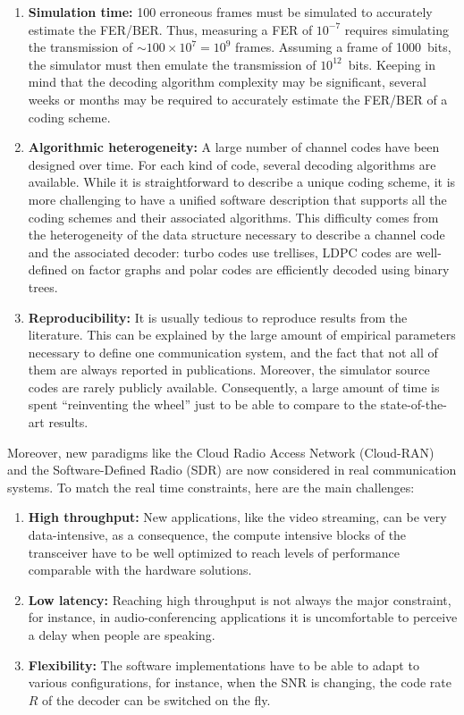 \begin{enumerate}
  \item \textbf{Simulation time:}
    100 erroneous frames must be simulated to accurately estimate the FER/BER.
    Thus, measuring a FER of $10^{-7}$ requires simulating the transmission of
    $\sim100\times 10^7=10^9$ frames. Assuming a frame of 1000~bits, the
    simulator must then emulate the transmission of $10^{12}$~bits. Keeping in
    mind that the decoding algorithm complexity may be significant, several
    weeks or months may be required to accurately estimate the FER/BER of a
    coding scheme.

  \item \textbf{Algorithmic heterogeneity:} A large number of channel codes have
    been designed over time. For each kind of code, several decoding algorithms
    are available. While it is straightforward to describe a unique coding
    scheme, it is more challenging to have a unified software description that
    supports all the coding schemes and their associated algorithms. This
    difficulty comes from the heterogeneity of the data structure necessary to
    describe a channel code and the associated decoder: turbo codes use
    trellises, LDPC codes are well-defined on factor graphs and polar codes are
    efficiently decoded using binary trees.

  \item \textbf{Reproducibility:} It is usually tedious to reproduce results
    from the literature. This can be explained by the large amount of empirical
    parameters necessary to define one communication system, and the fact that
    not all of them are always reported in publications. Moreover, the simulator
    source codes are rarely publicly available. Consequently, a large amount of
    time is spent ``reinventing the wheel'' just to be able to compare to the
    state-of-the-art results.
\end{enumerate}

Moreover, new paradigms like the Cloud Radio Access Network (Cloud-RAN) and the
Software-Defined Radio (SDR) are now considered in real communication systems.
To match the real time constraints, here are the main challenges:

\begin{enumerate}
  \item \textbf{High throughput:} New applications, like the video streaming,
    can be very data-intensive, as a consequence, the compute intensive blocks
    of the transceiver have to be well optimized to reach levels of performance
    comparable with the hardware solutions.
  \item \textbf{Low latency:} Reaching high throughput is not always the major
    constraint, for instance, in audio-conferencing applications it is
    uncomfortable to perceive a delay when people are speaking.
  \item \textbf{Flexibility:} The software implementations have to be able to
    adapt to various configurations, for instance, when the SNR is changing,
    the code rate $R$ of the decoder can be switched on the fly.
\end{enumerate}

